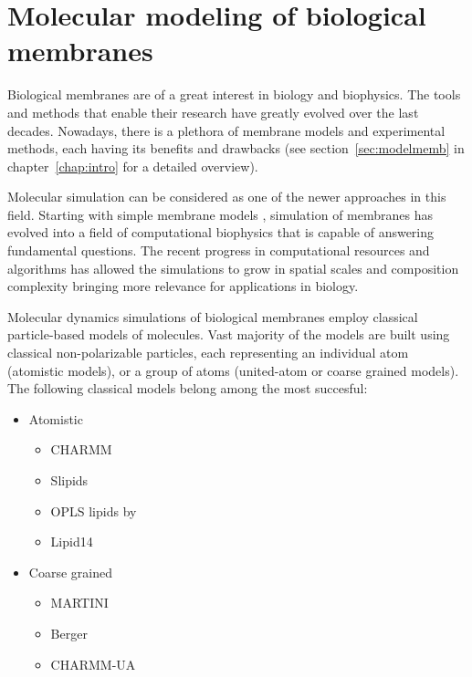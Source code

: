 \chapter{Molecular modeling of biological membranes}
\label{chap:methods}

Biological membranes are of a great interest in biology and biophysics. 
The tools and methods that enable their research have greatly evolved over the last decades. 
Nowadays, there is a plethora of membrane models and experimental methods, 
each having its benefits and drawbacks \citep{REF} 
(see section~\ref{sec:modelmemb} in chapter~\ref{chap:intro} for a detailed overview). 

Molecular simulation can be considered as one of the newer approaches in this field. 
Starting with simple membrane models \citep{REF} ,
simulation of membranes has evolved into a field of computational biophysics
that is capable of answering fundamental questions.
The recent progress in computational resources and algorithms
has allowed the simulations to grow in spatial scales and composition complexity
bringing more relevance for applications in biology. \citep{REF: CECAM workshop} 

Molecular dynamics simulations of biological membranes employ classical particle-based models of molecules. 
Vast majority of the models are built using classical non-polarizable particles, 
each representing an individual atom (atomistic models), 
or a group of atoms (united-atom or coarse grained models). 
The following classical models belong among the most succesful:
\begin{itemize}
 \item Atomistic
 \begin{itemize}
   \item CHARMM \citep{klauda10}
   \item Slipids \citep{jambeck12, jambeck12b}
   \item OPLS lipids by \citet{maciejewski14}
   \item Lipid14 \citep{dickson14}
  \end{itemize}

 \item Coarse grained
 \begin{itemize}
   \item MARTINI \citep{marrink07}
   \item Berger \citep{Berger97}
   \item CHARMM-UA \citep{lee14}
  \end{itemize}
\end{itemize}

